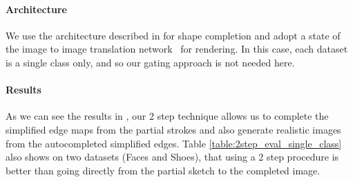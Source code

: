 \paragraph{Architecture} We use the architecture described in  for shape completion and adopt a state of the image to image translation network~\cite{wang2017high} for rendering. In this case, each dataset is a single class only, and so our gating approach is not needed here.

\paragraph{Results} As we can see the results in  , our 2 step technique allows us to complete the simplified edge maps from the partial strokes and also generate realistic images from the autocompleted simplified edges.
Table \ref{table:2step_eval_single_class} also shows on two datasets (Faces and Shoes), that using a 2 step procedure is better than going directly from the partial sketch to the completed image.


